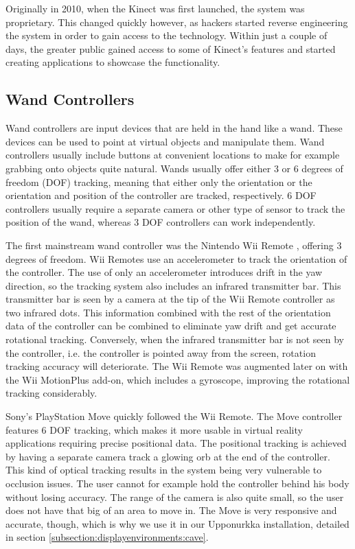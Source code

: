 \documentclass[12pt,a4paper,oneside,pdftex]{report}
\begin{document}
Originally in 2010, when the Kinect was first launched, the system was proprietary. This changed quickly however, as hackers started reverse engineering the system in order to gain access to the technology. Within just a couple of days, the greater public gained access to some of Kinect's features and started creating applications to showcase the functionality. \cite{giles2010inside}

\subsection{Wand Controllers}
\label{subsection:motion:move}

Wand controllers are input devices that are held in the hand like a wand. These devices can be used to point at virtual objects and manipulate them. Wand controllers usually include buttons at convenient locations to make for example grabbing onto objects quite natural. Wands usually offer either 3 or 6 degrees of freedom (DOF) tracking, meaning that either only the orientation or the orientation and position of the controller are tracked, respectively. 6 DOF controllers usually require a separate camera or other type of sensor to track the position of the wand, whereas 3 DOF controllers can work independently.

The first mainstream wand controller was the Nintendo Wii Remote \cite{WiiRemoteMain}, offering 3 degrees of freedom. Wii Remotes use an accelerometer to track the orientation of the controller. The use of only an accelerometer introduces drift in the yaw direction, so the tracking system also includes an infrared transmitter bar. This transmitter bar is seen by a camera at the tip of the Wii Remote controller as two infrared dots. This information combined with the rest of the orientation data of the controller can be combined to eliminate yaw drift and get accurate rotational tracking. Conversely, when the infrared transmitter bar is not seen by the controller, i.e. the controller is pointed away from the screen, rotation tracking accuracy will deteriorate. The Wii Remote was augmented later on with the Wii MotionPlus add-on, which includes a gyroscope, improving the rotational tracking considerably. 

Sony's PlayStation Move \cite{PSMoveMain} quickly followed the Wii Remote. The Move controller features 6 DOF tracking, which makes it more usable in virtual reality applications requiring precise positional data. The positional tracking is achieved by having a separate camera track a glowing orb at the end of the controller. This kind of optical tracking results in the system being very vulnerable to occlusion issues. The user cannot for example hold the controller behind his body without losing accuracy. The range of the camera is also quite small, so the user does not have that big of an area to move in. The Move is very responsive and accurate, though, which is why we use it in our Upponurkka installation, detailed in section \ref{subsection:displayenvironments:cave}.
\end{document}

